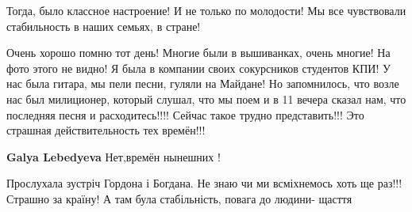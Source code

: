 \begin{itemize}

Тогда, было классное настроение! И не только по молодости! Мы все чувствовали
стабильность в наших семьях, в стране!


Очень хорошо помню тот день! Многие были в вышиванках, очень многие! На фото
этого не видно! Я была в компании своих сокурсников студентов КПИ! У нас была
гитара, мы пели песни, гуляли на Майдане! Но запомнилось, что возле нас был
милиционер, который слушал, что мы поем и в 11 вечера сказал нам, что последняя
песня и расходитесь!!!! Сейчас такое трудно представить!!! Это страшная
действительность тех времён!!!

\textbf{Galya Lebedyeva} Нет,времён нынешних !


Прослухала зустріч Гордона і Богдана. Не знаю чи ми всміхнемось хоть ще раз!!!
Страшно за країну! А там була стабільність, повага до людини- щасття

\end{itemize} %

